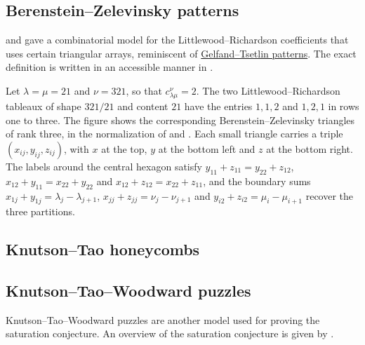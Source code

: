 \subsection[bzPatterns]{Berenstein--Zelevinsky patterns}

 and 
\cite{BerensteinZelevinsky1992} gave a combinatorial model for the
Littlewood--Richardson coefficients that uses certain triangular arrays,
reminiscent of \hyperref[gtpatterns]{Gelfand--Tsetlin patterns}.
The exact definition is written in an accessible manner in
\cite[Def.~A1.3.10]{StanleyEC2}.

\begin{example}
Let $\lambda=\mu=21$ and $\nu=321$, so that $c^{\nu}_{\lambda\mu}=2$.  The two
Littlewood--Richardson tableaux of shape $321/21$ and content $21$ have the
entries $1,1,2$ and $1,2,1$ in rows one to three.  The figure shows the
corresponding Berenstein--Zelevinsky triangles of rank three, in the
normalization of  and 
\cite[Sec.~5]{PakVallejo2005}.  Each small triangle carries a triple
$(x_{ij},y_{ij},z_{ij})$, with $x$ at the top, $y$ at the bottom left and $z$
at the bottom right.  The labels around the central hexagon satisfy
$y_{11}+z_{11}=y_{22}+z_{12}$, $x_{12}+y_{11}=x_{22}+y_{22}$ and
$x_{12}+z_{12}=x_{22}+z_{11}$, and the boundary sums $x_{1j}+y_{1j}=\lambda_j-\lambda_{j+1}$,
$x_{jj}+z_{jj}=\nu_j-\nu_{j+1}$ and $y_{i2}+z_{i2}=\mu_i-\mu_{i+1}$ recover the
three partitions.
\begin{figure}
\end{figure}
\end{example}


\subsection[knutsonTaoHoneycomb]{Knutson--Tao honeycombs}


\subsection[knutsonTaoWoodwardPuzzles]{Knutson--Tao--Woodward puzzles}

Knutson--Tao--Woodward puzzles
\cite{KnutsonTau1999,KnutsonTaoWoodward2004} are another model used for
proving the saturation conjecture.
An overview of the saturation conjecture is given by 
\cite{Buch2000}.

